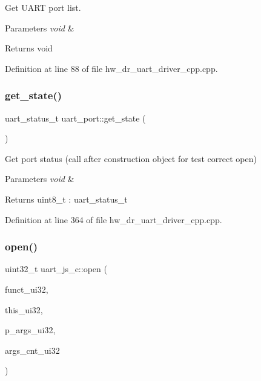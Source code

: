 Get U\+A\+RT port list. 


\begin{DoxyParams}{Parameters}
{\em void} & \\
\hline
\end{DoxyParams}
\begin{DoxyReturn}{Returns}
void 
\end{DoxyReturn}


Definition at line 88 of file hw\+\_\+dr\+\_\+uart\+\_\+driver\+\_\+cpp.\+cpp.

\mbox{\label{group___u_a_r_t_ga8f6c84c4ca8ecbc610a72cbd9e44ee83}} 
\subsubsection{get\_state()}
{\footnotesize\ttfamily uart\+\_\+status\+\_\+t uart\+\_\+port\+::get\+\_\+state (\begin{DoxyParamCaption}\item[{void}]{ }\end{DoxyParamCaption})}



Get port status (call after construction object for test correct open) 


\begin{DoxyParams}{Parameters}
{\em void} & \\
\hline
\end{DoxyParams}
\begin{DoxyReturn}{Returns}
uint8\+\_\+t \+: uart\+\_\+status\+\_\+t 
\end{DoxyReturn}


Definition at line 364 of file hw\+\_\+dr\+\_\+uart\+\_\+driver\+\_\+cpp.\+cpp.

\mbox{\label{group___u_a_r_t_ga338531eac56a2676eb69a07dadfa6142}} 
\subsubsection{open()\hspace{0.1cm}{\footnotesize\ttfamily [1/2]}}
{\footnotesize\ttfamily uint32\+\_\+t uart\+\_\+js\+\_\+c\+::open (\begin{DoxyParamCaption}\item[{const uint32\+\_\+t}]{funct\+\_\+ui32,  }\item[{const uint32\+\_\+t}]{this\+\_\+ui32,  }\item[{const uint32\+\_\+t $\ast$}]{p\+\_\+args\+\_\+ui32,  }\item[{const uint32\+\_\+t}]{args\+\_\+cnt\+\_\+ui32 }\end{DoxyParamCaption})\hspace{0.3cm}{\ttfamily [static]}}



